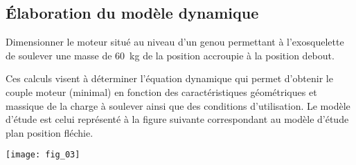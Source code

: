 \begin{multicols}{2}
%
%
%


\subsection*{Élaboration du modèle dynamique}

\begin{obj}
Dimensionner le moteur situé au niveau d’un genou permettant à l’exosquelette de soulever une masse de \SI{60}{kg} de la position accroupie à la position debout.
\end{obj}
\ifprof
\else
Ces calculs visent à déterminer l’équation dynamique qui permet d’obtenir le couple moteur (minimal) en fonction des caractéristiques géométriques et massique de la charge à soulever ainsi que des conditions d’utilisation.
Le modèle d’étude est celui représenté à la figure suivante correspondant au modèle d’étude plan position fléchie.
\begin{center}
\texttt{[image: fig\_03]}
\end{center}


\end{multicols}
